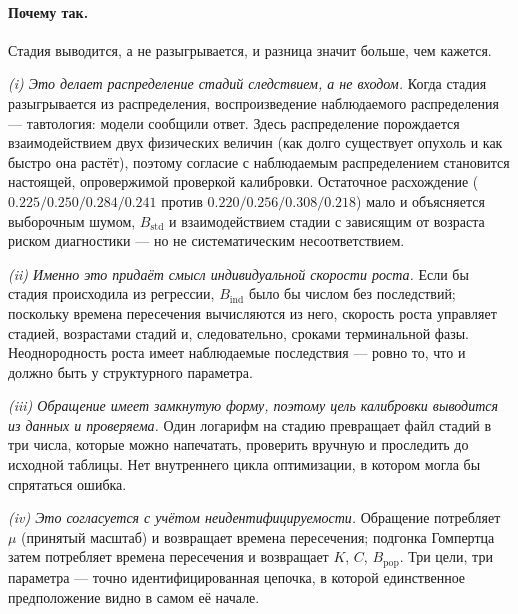 \documentclass[12pt,a4paper]{article}
\newcommand{\why}[1]{\paragraph{Почему так.} #1}
\begin{document}
\why{Стадия выводится, а не разыгрывается, и разница значит больше, чем кажется.

\emph{(i) Это делает распределение стадий следствием, а не входом.} Когда стадия разыгрывается из
распределения, воспроизведение наблюдаемого распределения --- тавтология: модели сообщили ответ. Здесь
распределение порождается взаимодействием двух физических величин (как долго существует опухоль и как быстро
она растёт), поэтому согласие с наблюдаемым распределением становится настоящей, опровержимой проверкой
калибровки. Остаточное расхождение ($0.225/0.250/0.284/0.241$ против $0.220/0.256/0.308/0.218$) мало и
объясняется выборочным шумом, $B_{\text{std}}$ и взаимодействием стадии с зависящим от возраста риском
диагностики --- но не систематическим несоответствием.

\emph{(ii) Именно это придаёт смысл индивидуальной скорости роста.} Если бы стадия происходила из
регрессии, $B_{\text{ind}}$ было бы числом без последствий; поскольку времена пересечения вычисляются из
него, скорость роста управляет стадией, возрастами стадий и, следовательно, сроками терминальной фазы.
Неоднородность роста имеет наблюдаемые последствия --- ровно то, что и должно быть у структурного параметра.

\emph{(iii) Обращение имеет замкнутую форму, поэтому цель калибровки выводится из данных и проверяема.} Один
логарифм на стадию превращает файл стадий в три числа, которые можно напечатать, проверить вручную и
проследить до исходной таблицы. Нет внутреннего цикла оптимизации, в котором могла бы спрятаться ошибка.

\emph{(iv) Это согласуется с учётом неидентифицируемости.} Обращение потребляет $\mu$ (принятый масштаб) и
возвращает времена пересечения; подгонка Гомпертца затем потребляет времена пересечения и возвращает $K$,
$C$, $B_{\text{pop}}$. Три цели, три параметра --- точно идентифицированная цепочка, в которой единственное
предположение видно в самом её начале.}
\end{document}
